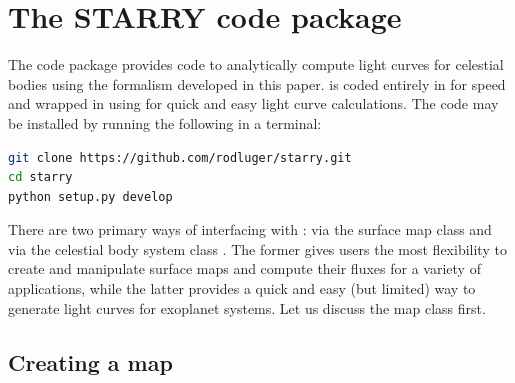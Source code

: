 \documentclass[modern]{aastex61}
\begin{document}
\section{The \textbf{STARRY} code package}
\label{sec:starrycode}

The \starry code package provides code to analytically
compute light curves for celestial bodies using the formalism developed
in this paper. \starry is coded entirely in \cpp for speed and wrapped
in \Python using \pybind \citep{pybind11} for quick and easy
light curve calculations. The
code may be installed by running the following in a terminal:
%
\begin{lstlisting}[language=bash]
git clone https://github.com/rodluger/starry.git
cd starry
python setup.py develop
\end{lstlisting}
%
There are two primary ways of interfacing with \starry: via the surface
map class \starryMap and via the celestial body system class
\starrySystem. The former gives users the most flexibility to
create and manipulate surface maps and compute their fluxes for a variety
of applications, while the latter provides a quick and easy (but limited)
way to generate light curves for exoplanet systems. Let us
discuss the map class first.

\subsection{Creating a map}
\label{sec:starrymap}
\end{document}
